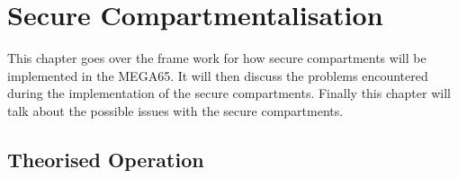 
\chapter{Secure Compartmentalisation} %

\label{Chapter 6} %

This chapter goes over the frame work for how secure compartments will be implemented in the MEGA65. It will then discuss the problems encountered during the implementation of the secure compartments. Finally this chapter will talk about the possible issues with the secure compartments.


\section{Theorised Operation}

\label{Ch6 Sec1}

